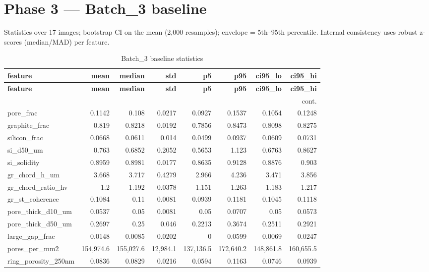 \documentclass[11pt,a4paper]{article}
\begin{document}
\section{Phase 3 --- Batch\_3 baseline}
Statistics over 17 images; bootstrap CI on the mean (2{,}000 resamples);
envelope = 5th--95th percentile. Internal consistency uses robust z-scores
(median/MAD) per feature.
\scriptsize
\begin{longtable}{lrrrrrrr}
\caption{Batch\_3 baseline statistics}\label{tab:baseline}\\
\toprule
\textbf{feature} & \textbf{mean} & \textbf{median} & \textbf{std} & \textbf{p5} & \textbf{p95} & \textbf{ci95\_lo} & \textbf{ci95\_hi} \\
\midrule
\endfirsthead
\toprule \textbf{feature} & \textbf{mean} & \textbf{median} & \textbf{std} & \textbf{p5} & \textbf{p95} & \textbf{ci95\_lo} & \textbf{ci95\_hi} \\
\midrule
\endhead
\midrule\multicolumn{8}{r}{\footnotesize cont.}\\\midrule\endfoot
\bottomrule\endlastfoot
pore\_frac & 0.1142 & 0.108 & 0.0217 & 0.0927 & 0.1537 & 0.1054 & 0.1248 \\
graphite\_frac & 0.819 & 0.8218 & 0.0192 & 0.7856 & 0.8473 & 0.8098 & 0.8275 \\
silicon\_frac & 0.0668 & 0.0611 & 0.014 & 0.0499 & 0.0937 & 0.0609 & 0.0731 \\
si\_d50\_um & 0.763 & 0.6852 & 0.2052 & 0.5653 & 1.123 & 0.6763 & 0.8627 \\
si\_solidity & 0.8959 & 0.8981 & 0.0177 & 0.8635 & 0.9128 & 0.8876 & 0.903 \\
gr\_chord\_h\_um & 3.668 & 3.717 & 0.4279 & 2.966 & 4.236 & 3.471 & 3.856 \\
gr\_chord\_ratio\_hv & 1.2 & 1.192 & 0.0378 & 1.151 & 1.263 & 1.183 & 1.217 \\
gr\_st\_coherence & 0.1084 & 0.11 & 0.0081 & 0.0939 & 0.1181 & 0.1045 & 0.1118 \\
pore\_thick\_d10\_um & 0.0537 & 0.05 & 0.0081 & 0.05 & 0.0707 & 0.05 & 0.0573 \\
pore\_thick\_d50\_um & 0.2697 & 0.25 & 0.046 & 0.2213 & 0.3674 & 0.2511 & 0.2921 \\
large\_gap\_frac & 0.0148 & 0.0085 & 0.0202 & 0 & 0.0599 & 0.0069 & 0.0247 \\
pores\_per\_mm2 & 154,974.6 & 155,027.6 & 12,984.1 & 137,136.5 & 172,640.2 & 148,861.8 & 160,655.5 \\
ring\_porosity\_250nm & 0.0836 & 0.0829 & 0.0216 & 0.0594 & 0.1163 & 0.0746 & 0.0939 \\

\end{longtable}
\end{document}
